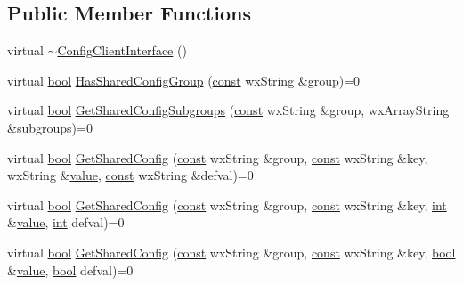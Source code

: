 \subsection*{Public Member Functions}
\begin{DoxyCompactItemize}
\item 
virtual \hyperlink{class_config_client_interface_a0c0cec79de1b2a0bbadd8859a385574c}{$\sim$\+Config\+Client\+Interface} ()
\item 
virtual \hyperlink{mac_2config_2i386_2lib-src_2libsoxr_2soxr-config_8h_abb452686968e48b67397da5f97445f5b}{bool} \hyperlink{class_config_client_interface_a25752caecf191c4953e0d99a8379acdf}{Has\+Shared\+Config\+Group} (\hyperlink{getopt1_8c_a2c212835823e3c54a8ab6d95c652660e}{const} wx\+String \&group)=0
\item 
virtual \hyperlink{mac_2config_2i386_2lib-src_2libsoxr_2soxr-config_8h_abb452686968e48b67397da5f97445f5b}{bool} \hyperlink{class_config_client_interface_ab70cd935fde1146d52e1378140098ecc}{Get\+Shared\+Config\+Subgroups} (\hyperlink{getopt1_8c_a2c212835823e3c54a8ab6d95c652660e}{const} wx\+String \&group, wx\+Array\+String \&subgroups)=0
\item 
virtual \hyperlink{mac_2config_2i386_2lib-src_2libsoxr_2soxr-config_8h_abb452686968e48b67397da5f97445f5b}{bool} \hyperlink{class_config_client_interface_a4b057e90a1f73e7a705ff962ee9178a8}{Get\+Shared\+Config} (\hyperlink{getopt1_8c_a2c212835823e3c54a8ab6d95c652660e}{const} wx\+String \&group, \hyperlink{getopt1_8c_a2c212835823e3c54a8ab6d95c652660e}{const} wx\+String \&key, wx\+String \&\hyperlink{lib_2expat_8h_a4a30a13b813682e68c5b689b45c65971}{value}, \hyperlink{getopt1_8c_a2c212835823e3c54a8ab6d95c652660e}{const} wx\+String \&defval)=0
\item 
virtual \hyperlink{mac_2config_2i386_2lib-src_2libsoxr_2soxr-config_8h_abb452686968e48b67397da5f97445f5b}{bool} \hyperlink{class_config_client_interface_a72063919113a804e9ebcc62536da7c01}{Get\+Shared\+Config} (\hyperlink{getopt1_8c_a2c212835823e3c54a8ab6d95c652660e}{const} wx\+String \&group, \hyperlink{getopt1_8c_a2c212835823e3c54a8ab6d95c652660e}{const} wx\+String \&key, \hyperlink{xmltok_8h_a5a0d4a5641ce434f1d23533f2b2e6653}{int} \&\hyperlink{lib_2expat_8h_a4a30a13b813682e68c5b689b45c65971}{value}, \hyperlink{xmltok_8h_a5a0d4a5641ce434f1d23533f2b2e6653}{int} defval)=0
\item 
virtual \hyperlink{mac_2config_2i386_2lib-src_2libsoxr_2soxr-config_8h_abb452686968e48b67397da5f97445f5b}{bool} \hyperlink{class_config_client_interface_a8502e4c7f866b9d167010343e840c5fe}{Get\+Shared\+Config} (\hyperlink{getopt1_8c_a2c212835823e3c54a8ab6d95c652660e}{const} wx\+String \&group, \hyperlink{getopt1_8c_a2c212835823e3c54a8ab6d95c652660e}{const} wx\+String \&key, \hyperlink{mac_2config_2i386_2lib-src_2libsoxr_2soxr-config_8h_abb452686968e48b67397da5f97445f5b}{bool} \&\hyperlink{lib_2expat_8h_a4a30a13b813682e68c5b689b45c65971}{value}, \hyperlink{mac_2config_2i386_2lib-src_2libsoxr_2soxr-config_8h_abb452686968e48b67397da5f97445f5b}{bool} defval)=0

\end{DoxyCompactItemize}
